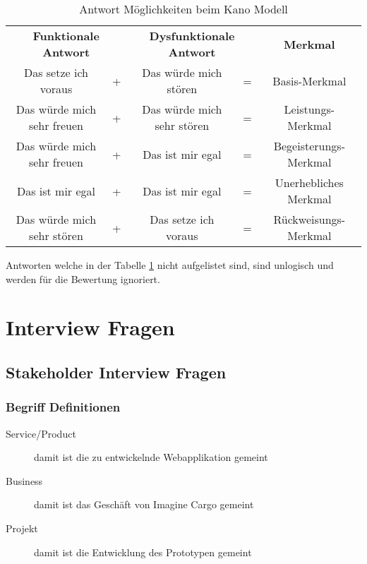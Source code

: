\begin{table}[h!]
\centering
\label{tbl:kanoantworten}
\begin{tabular}{clclc}
\multicolumn{2}{c}{\textbf{Funktionale Antwort}} & \multicolumn{2}{c}{\textbf{Dysfunktionale Antwort}} & \textbf{Merkmal}      \\
Das setze ich voraus                & +          & Das würde mich stören                 & =           & Basis-Merkmal         \\
Das würde mich sehr freuen          & +          & Das würde mich sehr stören            & =           & Leistungs-Merkmal     \\
Das würde mich sehr freuen          & +          & Das ist mir egal                      & =           & Begeisterungs-Merkmal \\
Das ist mir egal                    & +          & Das ist mir egal                      & =           & Unerhebliches Merkmal \\
Das würde mich sehr stören          & +          & Das setze ich voraus                  & =           & Rückweisungs-Merkmal
\end{tabular}
\caption{Antwort Möglichkeiten beim Kano Modell}
\end{table}

Antworten welche in der Tabelle \ref{tbl:kanoantworten} nicht aufgelistet sind, sind unlogisch und werden für die Bewertung ignoriert.

\newpage{}
\section{Interview Fragen}
\subsection{Stakeholder Interview Fragen}
\label{subsec:stakeholderfragen}
\subsubsection{Begriff Definitionen}
\begin{description}
  \item[Service/Product] damit ist die zu entwickelnde Webapplikation gemeint
  \item[Business] damit ist das Geschäft von Imagine Cargo gemeint
  \item[Projekt] damit ist die Entwicklung des Prototypen gemeint
\end{description}

